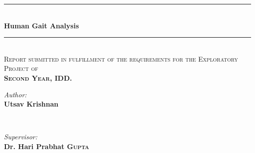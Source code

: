 \documentclass[a4paper]{report}
\begin{document}
\begin{titlepage}

\newcommand{\HRule}{\rule{\linewidth}{0.5mm}} %

\center %

\HRule \\[0.4cm]
{ \huge \bfseries Human Gait Analysis}\\[0.4cm] %
\HRule \\[1.5cm]

\textsc{\large Report submitted in fulfillment of the requirements
for the Exploratory Project of\\ %
\bfseries{Second Year, IDD}.}\\[0.5cm]


 

\begin{minipage}{0.4\textwidth}
\begin{flushleft} \large
\emph{Author:}\\
\bfseries Utsav Krishnan \\%
\end{flushleft}
\end{minipage}
~
\begin{minipage}{0.4\textwidth}
\begin{flushright} \large
\emph{Supervisor:} \\
\bfseries Dr. Hari Prabhat \textsc{Gupta} %
\end{flushright}
\end{minipage}\\[1cm]



\end{titlepage}
\end{document}
